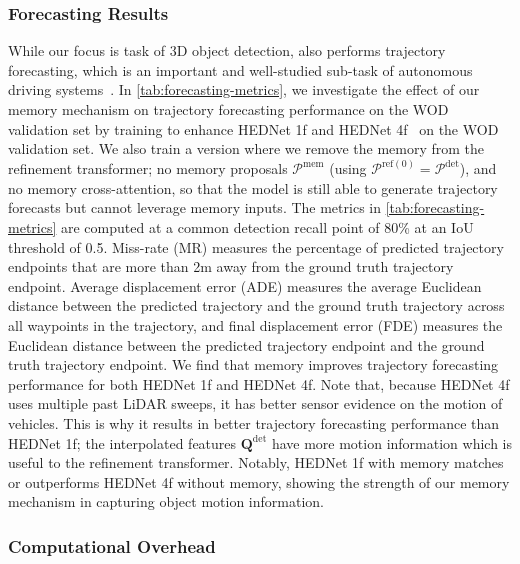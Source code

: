 \subsubsection{Forecasting Results}


While our focus is task
of 3D object detection, \ourmodel{} also performs trajectory forecasting,
which is an important and well-studied sub-task of autonomous
driving systems~\cite{chai2019multipath,varadarajan2022multipath++,cui2019multimodal,phan2020covernet,cui2023gorela,ngiam2021scene}.
In \cref{tab:forecasting-metrics}, we investigate the effect of our memory mechanism on trajectory forecasting
performance on the WOD validation set by training
\ourmodel{} to enhance HEDNet 1f and HEDNet 4f~\cite{hednet} on the WOD validation set.
We also train a version where we remove the memory from the refinement transformer;
no memory proposals $\mathcal{P}^\mathrm{mem}$ (using $\mathcal{P}^{\mathrm{ref}(0)} = \mathcal{P}^\mathrm{det}$),
and no memory cross-attention, so that the model is still able to generate trajectory forecasts but cannot leverage memory inputs.
The metrics in \cref{tab:forecasting-metrics} are computed at a common detection recall point of 80\%
at an IoU threshold of 0.5.
Miss-rate (MR) measures the percentage of predicted trajectory endpoints that are more than 2m away from the ground truth trajectory endpoint.
Average displacement error (ADE) measures the average Euclidean distance between the predicted trajectory and the ground truth trajectory across all waypoints in the trajectory,
and final displacement error (FDE) measures the Euclidean distance between the predicted trajectory endpoint and the ground truth trajectory endpoint.
We find that memory improves trajectory forecasting performance for both HEDNet 1f and HEDNet 4f.
Note that, because HEDNet 4f uses multiple past LiDAR sweeps, it has better sensor evidence on the motion of vehicles.
This is why it results in better trajectory forecasting performance than HEDNet 1f;
the interpolated features $\mathbf{Q}^\mathrm{det}$ have more motion information which is useful to the refinement transformer.
Notably, HEDNet 1f with memory matches or outperforms HEDNet 4f without memory, showing the strength of our memory mechanism in capturing object motion information.


\subsubsection{Computational Overhead}


